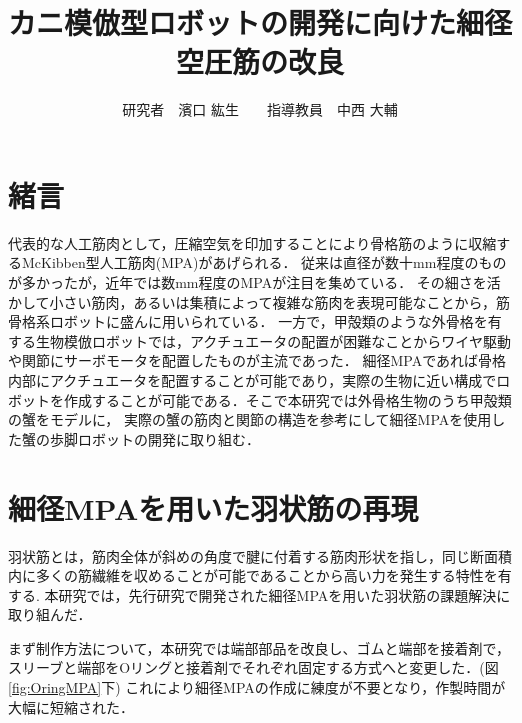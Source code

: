 \documentclass{jarticle}
\begin{document}

\title{
カニ模倣型ロボットの開発に向けた細径空圧筋の改良
}
\author{
\centering
研究者　濱口 紘生　　指導教員　中西 大輔
}

\maketitle

\thispagestyle{empty}  %

\section{緒言}

代表的な人工筋肉として，圧縮空気を印加することにより骨格筋のように収縮するMcKibben型人工筋肉(MPA)があげられる．
従来は直径が数十mm程度のものが多かったが，近年では数mm程度のMPAが注目を集めている\cite{wakimoto}．
その細さを活かして小さい筋肉，あるいは集積によって複雑な筋肉を表現可能なことから，筋骨格系ロボットに盛んに用いられている\cite{wakimoto}．
一方で，甲殻類のような外骨格を有する生物模倣ロボットでは，アクチュエータの配置が困難なことからワイヤ駆動や関節にサーボモータを配置したものが主流であった\cite{crabrobot1}．
細径MPAであれば骨格内部にアクチュエータを配置することが可能であり，実際の生物に近い構成でロボットを作成することが可能である．そこで本研究では外骨格生物のうち甲殻類の蟹をモデルに，
実際の蟹の筋肉と関節の構造を参考にして細径MPAを使用した蟹の歩脚ロボットの開発に取り組む．

\section{細径MPAを用いた羽状筋の再現}
羽状筋とは，筋肉全体が斜めの角度で腱に付着する筋肉形状を指し，同じ断面積内に多くの筋繊維を収めることが可能であることから高い力を発生する特性を有する.
本研究では，先行研究\cite{crabrobot2}で開発された細径MPAを用いた羽状筋の課題解決に取り組んだ．

まず制作方法について，本研究では端部部品を改良し、ゴムと端部を接着剤で，スリーブと端部をOリングと接着剤でそれぞれ固定する方式へと変更した．(図\ref{fig:OringMPA}下)
これにより細径MPAの作成に練度が不要となり，作製時間が大幅に短縮された．
\end{document}
